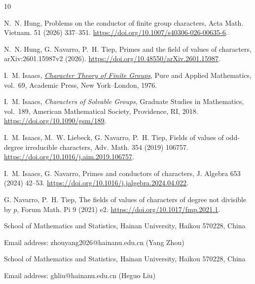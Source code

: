 \documentclass[reqno]{amsart}
\theoremstyle{definition}
\theoremstyle{remark}
\numberwithin{equation}{section}
\theoremstyle{plain}
\begin{document}
\begin{thebibliography}{10}

N.~N. Hung,
Problems on the conductor of finite group characters,
Acta Math. Vietnam. 51 (2026) 337--351.
\url{https://doi.org/10.1007/s40306-026-00635-6}.

N.~N. Hung, G. Navarro, P.~H. Tiep,
Primes and the field of values of characters,
arXiv:2601.15987v2 (2026).
\url{https://doi.org/10.48550/arXiv.2601.15987}.

I.~M. Isaacs,
\href{https://mathscinet.ams.org/mathscinet-getitem?mr=0460423}
{\emph{Character Theory of Finite Groups}},
Pure and Applied Mathematics, vol.~69,
Academic Press, New York--London, 1976.

I.~M. Isaacs,
\emph{Characters of Solvable Groups},
Graduate Studies in Mathematics, vol.~189,
American Mathematical Society, Providence, RI, 2018.
\url{https://doi.org/10.1090/gsm/189}.

I.~M. Isaacs, M.~W. Liebeck, G. Navarro, P.~H. Tiep,
Fields of values of odd-degree irreducible characters,
Adv. Math. 354 (2019) 106757.
\url{https://doi.org/10.1016/j.aim.2019.106757}.

I.~M. Isaacs, G. Navarro,
Primes and conductors of characters,
J. Algebra 653 (2024) 42--53.
\url{https://doi.org/10.1016/j.jalgebra.2024.04.022}.

G. Navarro, P.~H. Tiep,
The fields of values of characters of degree not divisible by $p$,
Forum Math. Pi 9 (2021) e2.
\url{https://doi.org/10.1017/fmp.2021.1}.

\end{thebibliography}



School of Mathematics and Statistics, Hainan University, Haikou 570228, China\par
Email address: zhouyang2026@hainanu.edu.cn (Yang Zhou)\par

\medskip

School of Mathematics and Statistics, Hainan University, Haikou 570228, China\par
Email address: ghliu@hainanu.edu.cn (Heguo Liu)\par
\end{document}
